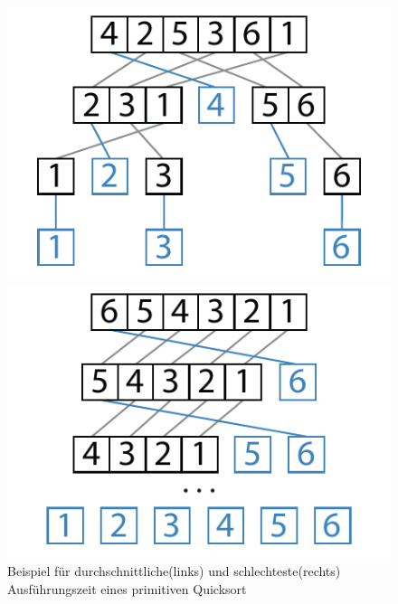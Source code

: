 \begin{figure}[h]
	\centering
	\begin{minipage}{.5\textwidth}
		\centering
		\includegraphics[width=\textwidth]{Graphics/Quicksort_example_avg}
	\end{minipage}%
	\begin{minipage}{.5\textwidth}
		\centering
		\includegraphics[width=\textwidth]{Graphics/Quicksort_example_wcet}
	\end{minipage}
	\caption{Beispiel für durchschnittliche(links) und schlechteste(rechts) Ausführungszeit eines primitiven Quicksort}
	\label{fig:quicksort_example}
\end{figure}

